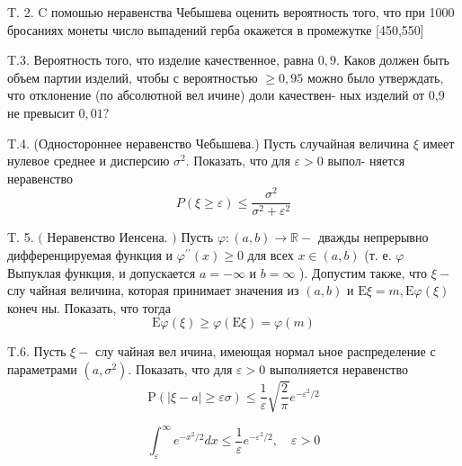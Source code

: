 \documentclass[a4paper,12pt]{article} %
\begin{document}
\begin{example}

T. 2. $\mathrm{C}$ помошью неравенства Чебышева оценить вероятность того, что при 1000 бросаниях монеты число выпадений герба окажется в промежутке [450,550]




\end{example}



\begin{example}

T.3. Вероятность того, что изделие качественное, равна $0,9 .$ Каков должен быть объем партии изделий, чтобы с вероятностью $\geq 0,95$ можно было утверждать, что отклонение (по абсолютной вел ичине) доли качествен-
ных изделий от 0,9 не превысит $0,01 ?$




\end{example}





\begin{example}


T.4. (Одностороннее неравенство Чебышева.) Пусть случайная величина $\xi$ имеет нулевое среднее и дисперсию $\sigma^{2} .$ Показать, что для $\varepsilon>0$ выпол-
няется неравенство
$$
P(\xi \geq \varepsilon) \leq \frac{\sigma^{2}}{\sigma^{2}+\varepsilon^{2}}
$$



\end{example}







\begin{example}


T. 5. $($ Неравенство Иенсена. $)$ Пусть $\varphi:(a, b) \rightarrow \mathbb{R}-$ дважды непрерывно дифференцируемая функция и $\varphi^{\prime \prime}(x) \geq 0$ для всех $x \in(a, b)$ (т. е. $\varphi$ Выпуклая функция, и допускается $a=-\infty$ и $b=\infty$ ). Допустим также, что $\xi-$ слу чайная величина, которая принимает значения из $(a, b)$ и $\mathrm{E} \xi=m, \mathrm{E} \varphi(\xi)$ конеч ны. Показать, что тогда
$$
\mathrm{E} \varphi(\xi) \geq \varphi(\mathrm{E} \xi)=\varphi(m)
$$



\end{example}



\begin{example}



T.6. Пусть $\xi-$ слу чайная вел ичина, имеющая нормал ьное распределение с параметрами $\left(a, \sigma^{2}\right) .$ Показать, что для $\varepsilon>0$ выполняется неравенство
$$
\mathrm{P}(|\xi-a| \geq \varepsilon \sigma) \leq \frac{1}{\varepsilon} \sqrt{\frac{2}{\pi}} e^{-\varepsilon^{2} / 2}
$$

$$\int_{\varepsilon}^{\infty} e^{-x^{2} / 2} d x \leq \frac{1}{\varepsilon} e^{-\varepsilon^{2} / 2}, \quad \varepsilon>0$$

\end{example}
\end{document}

